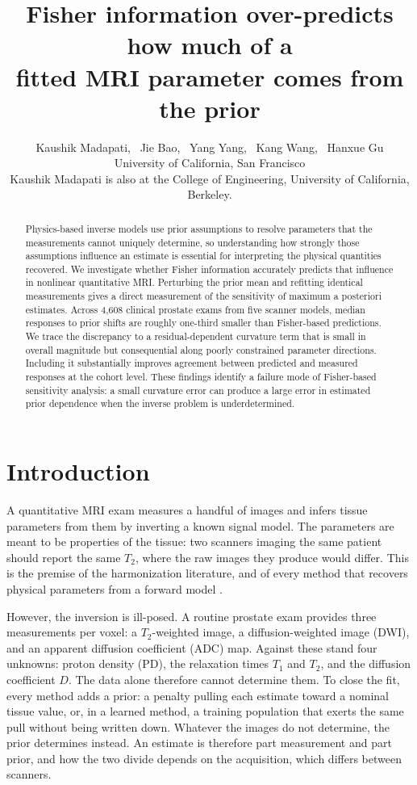 \documentclass{article}
\title{Fisher information over-predicts how much of a\\
fitted MRI parameter comes from the prior}
\author{%
  Kaushik Madapati, \ Jie Bao, \ Yang Yang, \ Kang Wang, \ Hanxue Gu \\
  University of California, San Francisco \\
  {\small Kaushik Madapati is also at the College of Engineering, University of California, Berkeley.}
}
\date{}
\begin{document}
\maketitle

\begin{abstract}
Physics-based inverse models use prior assumptions to resolve parameters that the measurements
cannot uniquely determine, so understanding how strongly those assumptions influence an estimate is
essential for interpreting the physical quantities recovered. We investigate whether Fisher
information accurately predicts that influence in nonlinear quantitative MRI. Perturbing the prior
mean and refitting identical measurements gives a direct measurement of the sensitivity of maximum
a posteriori estimates. Across 4{,}608 clinical prostate exams from five scanner models, median
responses to prior shifts are roughly one-third smaller than Fisher-based predictions. We trace the
discrepancy to a residual-dependent curvature term that is small in overall magnitude but
consequential along poorly constrained parameter directions. Including it substantially improves
agreement between predicted and measured responses at the cohort level. These findings identify a
failure mode of Fisher-based sensitivity analysis: a small curvature error can produce a large
error in estimated prior dependence when the inverse problem is underdetermined.
\end{abstract}

\section{Introduction}

A quantitative MRI exam measures a handful of images and infers tissue parameters from them by
inverting a known signal model. The parameters are meant to be properties of the tissue: two
scanners imaging the same patient should report the same $T_2$, where the raw images they produce
would differ. This is the premise of the harmonization literature, and of every method that
recovers physical parameters from a forward model \cite{borges2023,phycharm2025,vanlune2026,qiu2023,bloch_pinn2023}.

However, the inversion is ill-posed. A routine prostate exam provides three measurements per
voxel: a $T_2$-weighted image, a diffusion-weighted image (DWI), and an apparent diffusion
coefficient (ADC) map. Against these stand four unknowns: proton density (PD), the relaxation times $T_1$ and
$T_2$, and the diffusion coefficient $D$. The data alone therefore cannot determine them. To close the fit, every method adds a prior: a penalty pulling each estimate toward a
nominal tissue value, or, in a learned method, a training population that exerts the same pull
without being written down. Whatever the images do not determine, the prior determines instead. An
estimate is therefore part measurement and part prior, and how the two divide depends on the
acquisition, which differs between scanners.
\end{document}
